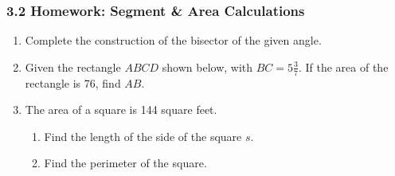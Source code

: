\documentclass[12pt, twoside]{article}
\begin{document}
  \subsubsection*{3.2 Homework: Segment \& Area Calculations}
  \begin{enumerate}

  \item Complete the construction of the bisector of the given angle. 
  \vspace{3cm}
    \begin{center}
    \end{center} \vspace{4cm}

  \item Given the rectangle $ABCD$ shown below, with $BC=5 \frac{3}{7}$. If the area of the rectangle is 76, find $AB$.
    \begin{flushleft}
    \end{flushleft}
    \vspace{1.5cm}

\newpage
  \item The area of a square is 144 square feet. 
    \begin{enumerate}
      \item Find the length of the side of the square $s$. \vspace{2cm}
      \item Find the perimeter of the square.
    \end{enumerate} \vspace{2cm}


\end{enumerate}
\end{document}
